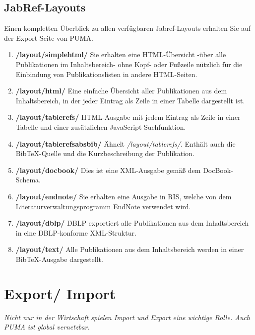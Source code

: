 \documentclass[b5paper,11pt,twoside]{scrbook} %
\begin{document}
\subsection{JabRef-Layouts}
Einen kompletten Überblick zu allen verfügbaren Jabref-Layouts erhalten Sie auf der Export-Seite von PUMA.
\begin{enumerate}
	\item  \textbf{/layout/simplehtml/}\newline
	Sie erhalten eine HTML-Übersicht -über alle Publikationen im 		Inhaltsbereich- ohne Kopf- oder Fußzeile nützlich für die 			Einbindung von Publikationslisten in andere HTML-Seiten.
	\item \textbf{/layout/html/}\newline
    Eine einfache Übersicht aller Publikationen aus dem Inhaltsbereich, in der jeder Eintrag als Zeile in einer Tabelle dargestellt ist.
	\item \textbf{/layout/tablerefs/} \newline
    HTML-Ausgabe mit jedem Eintrag als Zeile in einer Tabelle und einer zusätzlichen JavaScript-Suchfunktion.
\item \textbf{/layout/tablerefsabsbib/} \newline
    Ähnelt \textit{/layout/tablerefs/}. Enthält auch die BibTeX-Quelle und die Kurzbeschreibung der Publikation.
\item \textbf{/layout/docbook/} \newline
    Dies ist eine XML-Ausgabe gemäß dem DocBook-Schema.
\item \textbf{/layout/endnote/} \newline
    Sie erhalten eine Ausgabe in RIS, welche von dem Literaturverwaltungsprogramm EndNote verwendet wird.
\item \textbf{/layout/dblp/} \newline
    DBLP exportiert alle Publikationen aus dem Inhaltsbereich in eine DBLP-konforme XML-Struktur. 
\item \textbf{/layout/text/}\newline
    Alle Publikationen aus dem Inhaltsbereich werden in einer BibTeX-Ausgabe dargestellt.
\end{enumerate}

\newpage
\section{Export/ Import}
\textit{Nicht nur in der Wirtschaft spielen Import und Export eine wichtige Rolle. Auch PUMA ist global vernetzbar.}
\end{document}
